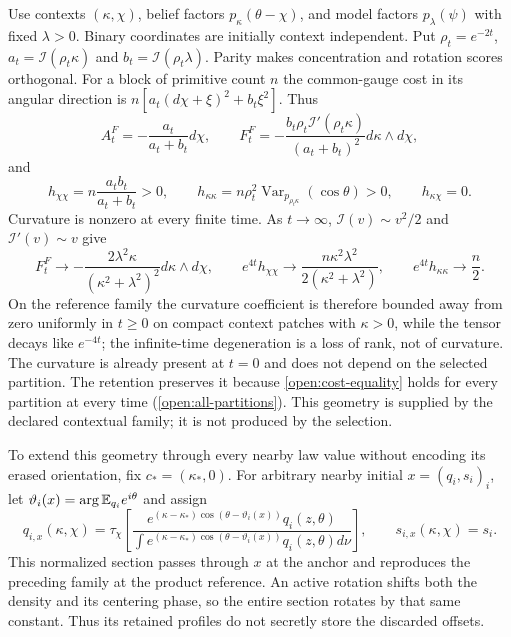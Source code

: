 Use contexts $(\kappa,\chi)$, belief factors $p_\kappa(\theta-\chi)$, and model factors $p_\lambda(\psi)$ with fixed $\lambda>0$. Binary coordinates are initially context independent. Put $\rho_t=e^{-2t}$,
$a_t=\mathcal I(\rho_t\kappa)$ and $b_t=\mathcal I(\rho_t\lambda)$. Parity makes concentration and rotation scores orthogonal. For a block of primitive count $n$ the common-gauge cost in its angular direction is
$n[a_t(d\chi+\xi)^2+b_t\xi^2]$. Thus
\begin{equation}
A_t^F=-\frac{a_t}{a_t+b_t}d\chi,\qquad
F_t^F=-\frac{b_t\rho_t\mathcal I'(\rho_t\kappa)}
{(a_t+b_t)^2}d\kappa\wedge d\chi,
\label{open:curvature}
\end{equation}
and
\begin{equation}
h_{\chi\chi}=n\frac{a_tb_t}{a_t+b_t}>0,\qquad
h_{\kappa\kappa}
=n\rho_t^2\operatorname{Var}_{p_{\rho_t\kappa}}(\cos\theta)>0,
\qquad h_{\kappa\chi}=0.
\label{open:rank}
\end{equation}
Curvature is nonzero at every finite time. As $t\to\infty$, $\mathcal I(v)\sim v^2/2$ and $\mathcal I'(v)\sim v$ give
\begin{equation}
F_t^F\longrightarrow-\frac{2\lambda^2\kappa}{(\kappa^2+\lambda^2)^2}d\kappa\wedge d\chi,
\qquad
e^{4t}h_{\chi\chi}\longrightarrow\frac{n\kappa^2\lambda^2}{2(\kappa^2+\lambda^2)},
\qquad
e^{4t}h_{\kappa\kappa}\longrightarrow\frac n2.
\label{open:geometry-limits}
\end{equation}
On the reference family the curvature coefficient is therefore bounded away from zero uniformly in $t\ge0$ on compact context patches with $\kappa>0$, while the tensor decays like $e^{-4t}$; the infinite-time degeneration is a loss of rank, not of curvature. The curvature is already present at $t=0$ and does not depend on the selected partition. The retention preserves it because \cref{open:cost-equality} holds for every partition at every time (\cref{open:all-partitions}). This geometry is supplied by the declared contextual family; it is not produced by the selection.

To extend this geometry through every nearby law value without encoding its erased orientation, fix $c_*=(\kappa_*,0)$. For arbitrary nearby initial $x=(q_i,s_i)_i$, let $\vartheta_i(x)=\arg\mathbb E_{q_i}e^{i\theta}$ and assign
\begin{equation}
q_{i,x}(\kappa,\chi)
=\tau_\chi\left[
\frac{e^{(\kappa-\kappa_*)\cos(\theta-\vartheta_i(x))}q_i(z,\theta)}
{\int e^{(\kappa-\kappa_*)\cos(\theta-\vartheta_i(x))}q_i(z,\theta)d\nu}
\right],
\qquad s_{i,x}(\kappa,\chi)=s_i.
\label{open:equivariant-lift}
\end{equation}
This normalized section passes through $x$ at the anchor and reproduces the preceding family at the product reference. An active rotation shifts both the density and its centering phase, so the entire section rotates by that same constant. Thus its retained profiles do not secretly store the discarded offsets.

